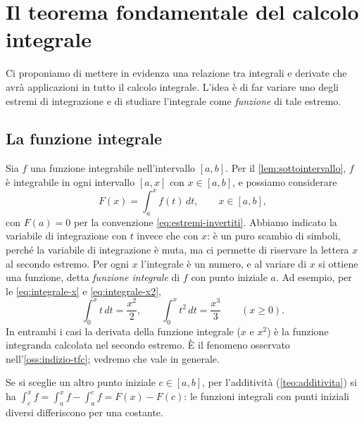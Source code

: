 \section{Il teorema fondamentale del calcolo integrale}
\label{sec:teorema-fondamentale}

Ci proponiamo di mettere in evidenza una relazione tra integrali e derivate che avrà
applicazioni in tutto il calcolo integrale. L'idea è di far variare uno degli estremi
di integrazione e di studiare l'integrale come \emph{funzione} di tale estremo.

\subsection{La funzione integrale}

Sia $f$ una funzione integrabile nell'intervallo $[a,b]$. Per il
\cref{lem:sottointervallo}, $f$ è integrabile in ogni intervallo $[a,x]$ con
$x\in[a,b]$, e possiamo considerare
\begin{equation}\label{eq:funzione-integrale}
  F(x)=\int_{a}^{x}f(t)\,dt, \qquad x\in[a,b] ,
\end{equation}
con $F(a)=0$ per la convenzione \eqref{eq:estremi-invertiti}. Abbiamo indicato la
variabile di integrazione con $t$ invece che con $x$: è un puro scambio di simboli,
perché la variabile di integrazione è muta, ma ci permette di riservare la lettera $x$
al secondo estremo. Per ogni $x$ l'integrale è un numero, e al variare di $x$ si ottiene
una funzione, detta \emph{funzione integrale} di $f$ con punto iniziale
$a$. Ad esempio, per le \eqref{eq:integrale-x} e
\eqref{eq:integrale-x2},
\begin{equation}\label{eq:funzioni-integrali-esempi}
  \int_{0}^{x}t\,dt=\frac{x^{2}}2, \qquad \int_{0}^{x}t^{2}\,dt=\frac{x^{3}}3
  \qquad (x\ge0) .
\end{equation}
In entrambi i casi la derivata della funzione integrale ($x$ e $x^{2}$) è la funzione
integranda calcolata nel secondo estremo. È il fenomeno osservato
nell'\cref{oss:indizio-tfc}; vedremo che vale in generale.

Se si sceglie un altro punto iniziale $c\in[a,b]$, per l'additività
(\cref{teo:additivita}) si ha $\int_{c}^{x}f=\int_{a}^{x}f-\int_{a}^{c}f=F(x)-F(c)$: le
funzioni integrali con punti iniziali diversi differiscono per una costante.


